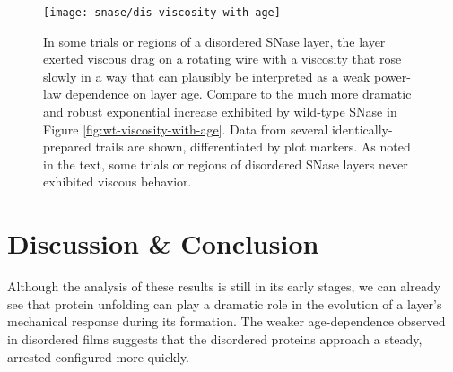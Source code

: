    \begin{figure}
    \centering
    \texttt{[image: snase/dis-viscosity-with-age]}
    \caption{\label{fig:dis-viscosity-with-age}In some trials or regions of a disordered SNase layer, the layer exerted viscous drag on a rotating wire with a viscosity that rose slowly in a way that can plausibly be interpreted as a weak power-law dependence on layer age. Compare to the much more dramatic and robust exponential increase exhibited by wild-type SNase in Figure \ref{fig:wt-viscosity-with-age}. Data from several identically-prepared trails are shown, differentiated by plot markers. As noted in the text, some trials or regions of disordered SNase layers never exhibited viscous behavior.}
    \end{figure}


\section{Discussion \& Conclusion}

Although the analysis of these results is still in its early stages, we can already see that protein unfolding can play a dramatic role in the evolution of a layer's mechanical response during its formation. The weaker age-dependence observed in disordered films suggests that the disordered proteins approach a steady, arrested configured more quickly.